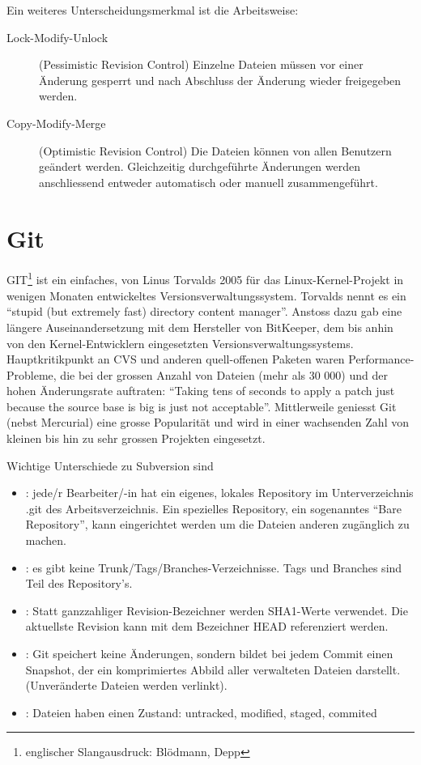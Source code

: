 \ifslides
\newpage
\fi
Ein weiteres Unterscheidungsmerkmal ist die Arbeitsweise:
\begin{description}
\item[Lock-Modify-Unlock] (Pessimistic Revision Control) Einzelne Dateien müssen vor einer
  Än\-derung gesperrt und nach Abschluss der Änderung wieder freigegeben werden.
\item[Copy-Modify-Merge] (Optimistic Revision Control)
   Die Dateien können von allen Benutzern
  geändert werden. Gleichzeitig durchgeführte Änderungen werden anschliessend
  entweder automatisch oder manuell zusammengeführt.
\end{description}
\newslide
\newpage
\section{Git}
GIT\footnote{englischer Slangausdruck: Blödmann, Depp}
 ist ein einfaches, von Linus Torvalds 2005 für das
 Linux-Kernel-Projekt
in wenigen Monaten entwickeltes
Versionsverwaltungssystem. Torvalds nennt es ein ``stupid
(but extremely fast) directory content manager''. Anstoss dazu gab eine
längere Auseinandersetzung mit dem Hersteller von BitKeeper, dem bis anhin von
den Kernel-Entwicklern eingesetzten
Versionsverwaltungssystems. Hauptkritikpunkt
an CVS und anderen quell-offenen Paketen waren Performance-Probleme, die bei
der grossen Anzahl von Dateien (mehr als 30 000) und der hohen Änderungsrate
auftraten: ``Taking tens of seconds to apply a patch just because the source
base is big is just not acceptable''. Mittlerweile geniesst Git (nebst
Mercurial) eine grosse Popularität und wird in einer wachsenden Zahl von
kleinen bis hin zu sehr grossen Projekten eingesetzt.

\newslide
Wichtige Unterschiede zu Subversion sind
\begin{itemize}
\item {}: jede/r
Bearbeiter/-in hat ein eigenes, lokales Repository im Unterverzeichnis
.git des Arbeitsverzeichnis. Ein spezielles Repository,
ein sogenanntes ``Bare Repository'', kann eingerichtet werden
um die Dateien anderen zugänglich zu machen.
\item {}: es gibt keine
  Trunk/Tags/Branches-Verzeichnisse. Tags und Branches sind Teil
  des Repository's.
\item {}: Statt ganzzahliger
  Revision-Bezeichner werden SHA1-Werte verwendet.
  Die aktuellste Revision kann mit dem Bezeichner HEAD referenziert werden.
\item {}:
     Git speichert keine Änderungen, sondern bildet bei
jedem Commit einen Snapshot, der ein komprimiertes Abbild aller
verwalteten Dateien darstellt. (Unveränderte Dateien werden verlinkt).
\item {}: Dateien haben einen Zustand: untracked,
  modified, staged, commited
\end{itemize}

